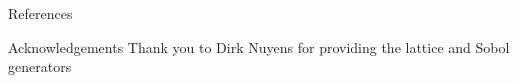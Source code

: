 \documentclass[final]{beamer}
\newlength{\onecolwid}
\begin{document}
\begin{frame}[t]
\begin{columns}[t]
\begin{column}{\onecolwid}
\vspace{-.5in}
\begin{block}{References}

\nocite{*} %
\small{  %
}

\end{block}

\vspace{-.3in}
\begin{block}{Acknowledgements}
    Thank you to Dirk Nuyens for providing the lattice and Sobol generators 
\end{block}
\end{column}
\end{columns}
\end{frame}
\end{document}
